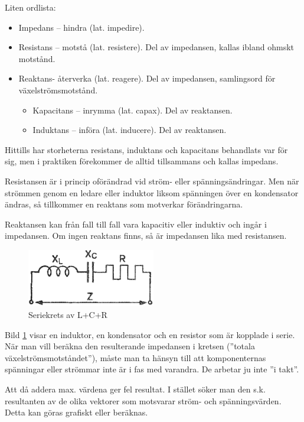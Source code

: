 Liten ordlista:
\begin{itemize}
\item Impedans -- hindra (lat. impedire).
\item Resistans -- motstå (lat. resistere).
  Del av impedansen, kallas ibland ohmskt motstånd.
\item Reaktans- återverka (lat. reagere).
  Del av impedansen, samlingsord för växelströmsmotstånd.
  \begin{itemize}
  \item Kapacitans -- inrymma (lat. capax). Del av reaktansen.
  \item Induktans -- införa (lat. inducere). Del av reaktansen.
  \end{itemize}
\end{itemize}

Hittills har storheterna resistans, induktans och kapacitans behandlats var för
sig, men i praktiken förekommer de alltid tillsammans och kallas impedans.

Resistansen är i princip oförändrad vid ström- eller spänningsändringar.
Men när strömmen genom en ledare eller induktor liksom spänningen över en
kondensator ändras, så tillkommer en reaktans som motverkar förändringarna.

Reaktansen kan från fall till fall vara kapacitiv eller induktiv och ingår i
impedansen.
Om ingen reaktans finns, så är impedansen lika med resistansen.

\begin{figure}
\includegraphics[width=0.5\textwidth]{images/cropped_pdfs/bild_2_3-12.pdf}
\caption{Seriekrets av L+C+R}
\label{fig:BildII3-12}
\end{figure}

Bild \ref{fig:BildII3-12} visar en induktor, en kondensator och en resistor
som är kopplade i serie.
När man vill beräkna den resulterande impedansen i kretsen
(''totala växelströmsmotståndet''), måste man ta hänsyn till att komponenternas
spänningar eller strömmar inte är i fas med varandra.
De arbetar ju inte ''i takt''.

Att då addera max. värdena ger fel resultat.
I stället söker man den s.k. resultanten av de olika vektorer som motsvarar
ström- och spänningsvärden.
Detta kan göras grafiskt eller beräknas.

